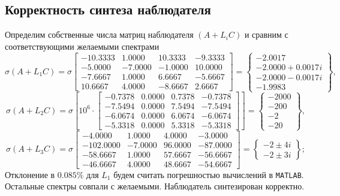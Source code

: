 \documentclass[a4paper, 12pt]{article}
\begin{document}
    \subsection{Корректность синтеза наблюдателя}
    Определим собственные числа матриц наблюдателя $\left(A+L_iC\right)$
    и сравним с соответствующими желаемыми спектрами
    $$
    \sigma\left(A+L_1C\right)=\sigma\begin{bmatrix}
    -10.3333    &1.0000   &10.3333   &-9.3333\\
   -5.0000   &-7.0000   &-1.0000   &10.0000\\
   -7.6667    &1.0000    &6.6667   &-5.6667\\
   10.6667    &4.0000   &-8.6667    &2.6667
    \end{bmatrix}=
    \left\{
    \begin{matrix}
        -2.0017\\
    -2.0000 + 0.0017i\\
    -2.0000 - 0.0017i\\
    -1.9983
    \end{matrix}\right\},
    $$
    $$
    \sigma\left(A+L_2C\right)=\sigma\left[10^6\cdot\begin{bmatrix}
    -0.7378    &0.0000    &0.7378   &-0.7378\\
   -7.5494   &0.0000    &7.5494   &-7.5494\\
   -6.0674    &0.0000    &6.0674   &-6.0674\\
   -5.3318    &0.0000    &5.3318   &-5.3318
    \end{bmatrix}\right]=\left\{\begin{matrix}
    -2000\\
   -200\\
   -2\\
   -20
    \end{matrix}\right\},
    $$
    $$
    \sigma\left(A+L_3C\right)=\sigma\begin{bmatrix}
        -4.0000    &1.0000    &4.0000   &-3.0000\\
 -102.0000   &-7.0000   &96.0000  &-87.0000\\
  -58.6667    &1.0000   &57.6667  &-56.6667\\
  -46.6667    &4.0000   &48.6667  &-54.6667
    \end{bmatrix}=\left\{\begin{matrix}
        -2\pm4i\\
        -2\pm3i
    \end{matrix}\right\};
    $$
    Отклонение в $0.085\%$ для $L_1$ будем считать погрешностью вычислений в \texttt{MATLAB}.
    Остальные спектры совпали с желаемыми. Наблюдатель синтезирован корректно.
\end{document}
